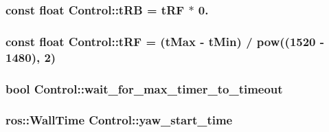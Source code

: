 \subsubsection[{\texorpdfstring{t\+RB}{tRB}}]{\setlength{\rightskip}{0pt plus 5cm}const float Control\+::t\+RB = {\bf t\+RF} $\ast$ 0.\hspace{0.3cm}{\ttfamily [private]}}\hypertarget{classControl_a5a5a86dff393624defa3747d2e2a39b3}{}\label{classControl_a5a5a86dff393624defa3747d2e2a39b3}
\subsubsection[{\texorpdfstring{t\+RF}{tRF}}]{\setlength{\rightskip}{0pt plus 5cm}const float Control\+::t\+RF = ({\bf t\+Max} -\/ {\bf t\+Min}) / pow((1520 -\/ 1480), 2)\hspace{0.3cm}{\ttfamily [private]}}\hypertarget{classControl_acc43d71e4a89ff753f7d12f7fa562f7f}{}\label{classControl_acc43d71e4a89ff753f7d12f7fa562f7f}
\subsubsection[{\texorpdfstring{wait\+\_\+for\+\_\+max\+\_\+timer\+\_\+to\+\_\+timeout}{wait_for_max_timer_to_timeout}}]{\setlength{\rightskip}{0pt plus 5cm}bool Control\+::wait\+\_\+for\+\_\+max\+\_\+timer\+\_\+to\+\_\+timeout\hspace{0.3cm}{\ttfamily [private]}}\hypertarget{classControl_a91aff903721b3e11bc7e4ea1d621dfbf}{}\label{classControl_a91aff903721b3e11bc7e4ea1d621dfbf}
\subsubsection[{\texorpdfstring{yaw\+\_\+start\+\_\+time}{yaw_start_time}}]{\setlength{\rightskip}{0pt plus 5cm}ros\+::\+Wall\+Time Control\+::yaw\+\_\+start\+\_\+time\hspace{0.3cm}{\ttfamily [private]}}\hypertarget{classControl_a6934796a534d791ffea03448b383957b}{}\label{classControl_a6934796a534d791ffea03448b383957b}
